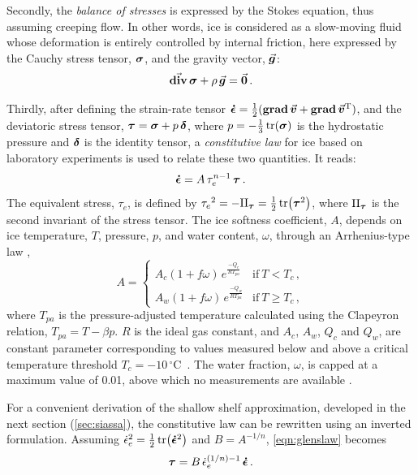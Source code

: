 \documentclass[a4paper]{kappa}
\newcommand{\vect}[1]{\va*{#1}} %
\newcommand{\tens}[1]{\vb*{#1}} %
\newcommand{\tdiv}[1]{\vect{\mathrm{div}}\,#1}      %
\newcommand{\tgrad}[1]{\tens{\mathrm{grad}}\,#1}    %
\newcommand{\doteps}[0]{\dot{\epsilon}} %
\newcommand{\IDT}[0]{\tens{\delta}}     %
\newcommand{\CST}[0]{\tens{\sigma}}     %
\newcommand{\DST}[0]{\tens{\tau}}       %
\newcommand{\SRT}[0]{\tens{\doteps}}    %
\newcommand{\vv}[0]{\vect{v}}           %
\newcommand{\unit}[1]{\ensuremath{\mathrm{#1}}}
\newcommand{\degree}[0]{\ensuremath{^{\circ}}}
\newcommand{\degC}[0]{\unit{{\degree}C}}
\begin{document}
Secondly, the \emph{balance of stresses} is expressed by the Stokes equation,
thus assuming creeping flow. In other words, ice is considered as a slow-moving
fluid whose deformation is entirely controlled by internal friction, here
expressed by the Cauchy stress tensor, $\CST$, and the gravity vector,
$\vect{g}$:
\begin{equation}
    \label{eqn:stressbalance}
    \tdiv{\CST} + \rho\,\vect{g} = \vect{0} \,.
\end{equation}

Thirdly, after defining the strain-rate tensor
${\SRT = \frac{1}{2}(\tgrad{\vv} + \tgrad{\vv}^{\mathrm{T}})}$,
and the deviatoric stress tensor, ${\DST = \CST + p\,\IDT}$,
where $p=-\frac{1}{3}\tr(\CST)$ is the hydrostatic pressure and
$\tens{\delta}$ is the identity tensor, a \emph{constitutive law} for ice
\citep{Nye.1953} based on laboratory experiments \citep{Glen.1952} is used to
relate these two quantities. It reads:
\begin{equation}
    \label{eqn:glenslaw}
    \SRT = A\,\tau_e^{n-1}\,\DST \,.
\end{equation}
The equivalent stress, $\tau_e$, is defined by
${\tau_e}^2 = -\mathrm{II}_{\DST} = \frac{1}{2} \tr(\DST^2)$,
where $\mathrm{II}_{\DST}$ is the second invariant of the stress tensor.
The ice softness coefficient, $A$, depends on ice temperature, $T$, pressure, $p$, and
water content, $\omega$, through an Arrhenius-type law
\citep[Eqs.~63--65]{Paterson.Budd.1982, Aschwanden.etal.2012},
\begin{equation}
    A =
    \begin{cases}
        A_c (1+f\omega)\,e^\frac{-Q_c}{RT_{pa}}
            & \text{if}\ T < T_c \,, \\
        A_w (1+f\omega)\,e^\frac{-Q_w}{RT_{pa}}
            & \text{if}\ T \ge T_c \,,
    \end{cases}
\end{equation}
where $T_{pa}$ is the pressure-adjusted temperature calculated using the
Clapeyron relation, ${T_{pa} = T - \beta p}$. $R$ is the ideal gas constant,
and $A_c$, $A_w$, $Q_c$ and $Q_w$, are constant parameter corresponding to
values measured below and above a critical temperature threshold
${T_c=-10}$\,\degC\ \citep[\cref{tab:params};][]{Paterson.Budd.1982}.
The water fraction, $\omega$, is capped at a maximum value of 0.01, above which
no measurements are available \citep[Eq.~5.7]{Lliboutry.Duval.1985,
Greve.1997}.

For a convenient derivation of the shallow shelf approximation, developed in
the next section (\cref{sec:siassa}), the constitutive law can be rewritten
using an inverted formulation. Assuming
${{\doteps_e}^2 = \frac{1}{2} \tr(\SRT^2)}$ and ${B=A^{-1/n}}$,
\cref{eqn:glenslaw} becomes
\begin{equation}
    \label{eqn:invglenslaw}
    \DST = B\,\doteps_e^{(1/n)-1}\,\SRT \,.
\end{equation}
\end{document}
